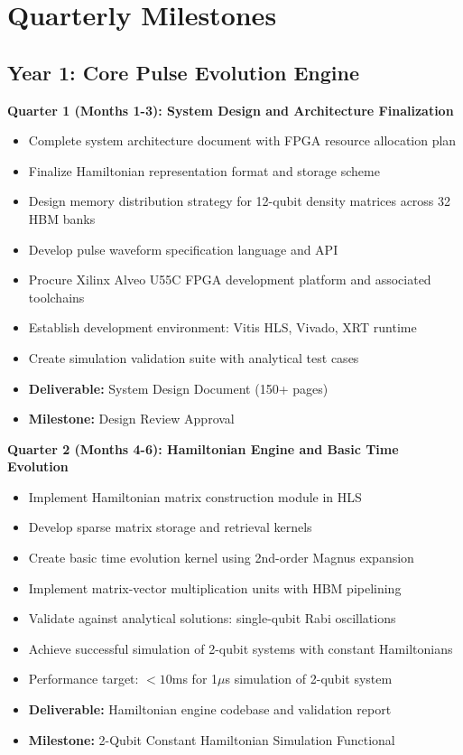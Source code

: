 \documentclass[12pt,a4paper]{article}
\begin{document}
\newpage

\section{Quarterly Milestones}

\subsection{Year 1: Core Pulse Evolution Engine}

\textbf{Quarter 1 (Months 1-3): System Design and Architecture Finalization}

\begin{itemize}[noitemsep]
\item Complete system architecture document with FPGA resource allocation plan
\item Finalize Hamiltonian representation format and storage scheme
\item Design memory distribution strategy for 12-qubit density matrices across 32 HBM banks
\item Develop pulse waveform specification language and API
\item Procure Xilinx Alveo U55C FPGA development platform and associated toolchains
\item Establish development environment: Vitis HLS, Vivado, XRT runtime
\item Create simulation validation suite with analytical test cases
\item \textbf{Deliverable:} System Design Document (150+ pages)
\item \textbf{Milestone:} Design Review Approval
\end{itemize}

\textbf{Quarter 2 (Months 4-6): Hamiltonian Engine and Basic Time Evolution}

\begin{itemize}[noitemsep]
\item Implement Hamiltonian matrix construction module in HLS
\item Develop sparse matrix storage and retrieval kernels
\item Create basic time evolution kernel using 2nd-order Magnus expansion
\item Implement matrix-vector multiplication units with HBM pipelining
\item Validate against analytical solutions: single-qubit Rabi oscillations
\item Achieve successful simulation of 2-qubit systems with constant Hamiltonians
\item Performance target: $<10$ms for 1$\mu$s simulation of 2-qubit system
\item \textbf{Deliverable:} Hamiltonian engine codebase and validation report
\item \textbf{Milestone:} 2-Qubit Constant Hamiltonian Simulation Functional
\end{itemize}
\end{document}
